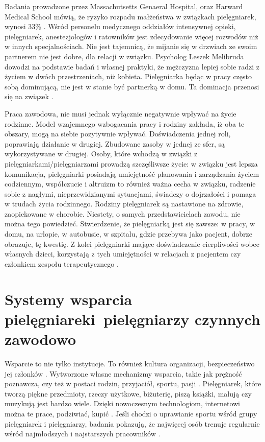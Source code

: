 \documentclass[a4paper,12pt,twoside,openright]{mwrep}
\begin{document}
Badania prowadzone przez Massachutsetts Genaeral Hospital, oraz Harward Medical School mówią, że ryzyko rozpadu małżeństwa w związkach pielęgniarek, wynosi 33\% \cite{rozwody}.  Wśród personelu medycznego oddziałów intensywnej opieki, pielęgniarek, anestezjologów i ratowników jest zdecydowanie więcej rozwodów niż w innych specjalnościach.  Nie jest tajemnicą, że mijanie się w drzwiach ze swoim partnerem nie jest dobre, dla relacji w związku. Psycholog Leszek Melibruda dowodzi na podstawie badań i własnej praktyki, że mężczyzna lepiej sobie radzi z życiem w dwóch przestrzeniach, niż kobieta. Pielęgniarka będąc w pracy często sobą dominującą, nie jest w stanie być partnerką w domu. Ta dominacja przenosi się na związek \cite{melibruda}.

Praca zawodowa, nie musi jednak wyłącznie negatywnie wpływać na życie rodzinne. Model wzajemnego wzbogacania pracy i rodziny zakłada, iż oba te obszary, mogą na siebie pozytywnie wpływać. Doświadczenia jednej roli, poprawiają działanie w drugiej. Zbudowane zasoby w jednej ze sfer, są wykorzystywane w drugiej.  Osoby, które wchodzą w związki z pielęgniarkami/pielęgniarzami prowadzą szczęśliwsze życie: w związku jest lepsza komunikacja, pielęgniarki posiadają umiejętność planowania i zarządzania życiem codziennym, współczucie i altruizm to również ważna cecha w związku, radzenie sobie z nagłymi, nieprzewidzianymi sytuacjami, świadczy o dojrzałości i pomaga w trudach życia rodzinnego. Rodziny pielęgniarek są nastawione na zdrowie, zaopiekowane w chorobie. Niestety, o samych przedstawicielach zawodu, nie można tego powiedzieć. Stwierdzenie, że pielęgniarką jest się zawsze: w pracy, w domu, na urlopie, w autobusie, w szpitalu, gdzie przebywa jako pacjent, dobrze obrazuje, tę kwestię. Z kolei pielęgniarki mające doświadczenie cierpliwości wobec własnych dzieci, korzystają z tych umiejętności w relacjach z pacjentem czy członkiem zespołu terapeutycznego \cite{wzbogacanie}.

\section{Systemy wsparcia pielęgniarek\newline i~pielęgniarzy czynnych zawodowo}
\label{sectionSystemyWsparcia}
Wsparcie to nie tylko instytucje. To również kultura organizacji, bezpieczeństwo jej członków \cite{bezpieczenstwo}. Wytworzone własne mechanizmy wsparcia, takie jak  prężność poznawcza, czy też w postaci  rodzin, przyjaciół, sportu, pasji \cite{preznosc}. Pielęgniarek, które tworzą piękne przedmioty, rzeczy użytkowe, biżuterię, piszą książki, malują czy muzykują  jest bardzo wiele. Dzięki nowoczesnym technologiom, internetowi można te prace, podziwiać, kupić \cite{talent}. Jeśli chodzi o uprawianie sportu wśród grupy pielęgniarek i pielęgniarzy, badania pokazują, że najwięcej osób trenuje regularnie wśród najmłodszych i najstarszych pracowników \cite{sport}.
\end{document}
